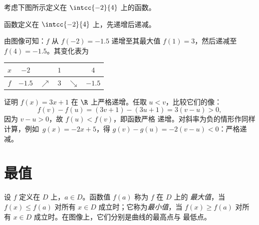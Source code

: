 \begin{example}\label{ex:g10:functions:table}
考虑下图所示定义在 $\intcc{-2}{4}$ 上的函数。

\begin{omfigure}

{\small 函数定义在 $\intcc{-2}{4}$ 上，先递增后递减。}
\end{omfigure}

由图像可知：$f$ 从 $f(-2) = -1.5$ 递增至其最大值
$f(1) = 3$，然后递减至 $f(4) = -1.5$。其变化表为
\begin{center}
\renewcommand{\arraystretch}{1.3}
\begin{tabular}{c|ccccc}
$x$ & $-2$ & & $1$ & & $4$ \\
\hline
$f$ & $-1.5$ & $\nearrow$ & $3$ & $\searrow$ & $-1.5$ \\
\end{tabular}
\end{center}
\end{example}

\begin{example}[证明单调性]\label{ex:g10:functions:proof}
证明 $f(x) = 3x + 1$ 在 $\R$ 上严格递增。任取
$u < v$，比较它们的像：
\[
f(v) - f(u) = (3v + 1) - (3u + 1) = 3(v - u) > 0,
\]
因为 $v - u > 0$，故 $f(u) < f(v)$，即函数严格
递增。对斜率为负的情形作同样计算，例如\
$g(x) = -2x + 5$，得 $g(v) - g(u) = -2(v-u) < 0$：严格递减。
\end{example}

\section{最值}

\begin{definition}[最大值、最小值]\label{def:g10:functions:extrema}
设 $f$ 定义在 $D$ 上，$a \in D$。函数值 $f(a)$ 称为 $f$ 在 $D$ 上的
\emph{最大值}，当 $f(x) \leq f(a)$ 对所有
$x \in D$ 成立时；它称为\emph{最小值}，当
$f(x) \geq f(a)$ 对所有 $x \in D$ 成立时。在图像上，它们分别是曲线的最高点与
最低点。
\end{definition}

